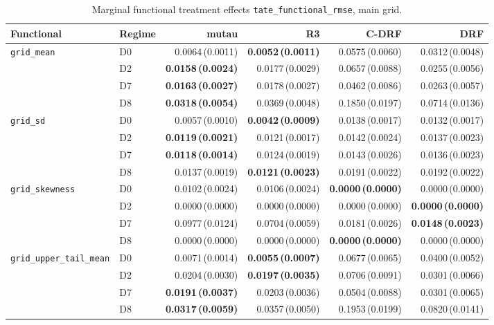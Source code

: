 \begin{table}[htbp]
\centering
\caption{Marginal functional treatment effects \texttt{tate\_functional\_rmse}, main grid.}
\label{tab:p55-tate}
\scriptsize
\setlength{\tabcolsep}{3.2pt}
\begin{tabular}{@{}llrrrr@{}}
\toprule
Functional & Regime & mutau & R3 & C-DRF & DRF \\
\midrule
\texttt{grid\_mean} & D0 & 0.0064\,(0.0011) & \textbf{0.0052\,(0.0011)} & 0.0575\,(0.0060) & 0.0312\,(0.0048) \\
 & D2 & \textbf{0.0158\,(0.0024)} & 0.0177\,(0.0029) & 0.0657\,(0.0088) & 0.0255\,(0.0056) \\
 & D7 & \textbf{0.0163\,(0.0027)} & 0.0178\,(0.0027) & 0.0462\,(0.0086) & 0.0263\,(0.0057) \\
 & D8 & \textbf{0.0318\,(0.0054)} & 0.0369\,(0.0048) & 0.1850\,(0.0197) & 0.0714\,(0.0136) \\
\midrule
\texttt{grid\_sd} & D0 & 0.0057\,(0.0010) & \textbf{0.0042\,(0.0009)} & 0.0138\,(0.0017) & 0.0132\,(0.0017) \\
 & D2 & \textbf{0.0119\,(0.0021)} & 0.0121\,(0.0017) & 0.0142\,(0.0024) & 0.0137\,(0.0023) \\
 & D7 & \textbf{0.0118\,(0.0014)} & 0.0124\,(0.0019) & 0.0143\,(0.0026) & 0.0136\,(0.0023) \\
 & D8 & 0.0137\,(0.0019) & \textbf{0.0121\,(0.0023)} & 0.0191\,(0.0022) & 0.0192\,(0.0022) \\
\midrule
\texttt{grid\_skewness} & D0 & 0.0102\,(0.0024) & 0.0106\,(0.0024) & \textbf{0.0000\,(0.0000)} & 0.0000\,(0.0000) \\
 & D2 & 0.0000\,(0.0000) & 0.0000\,(0.0000) & 0.0000\,(0.0000) & \textbf{0.0000\,(0.0000)} \\
 & D7 & 0.0977\,(0.0124) & 0.0704\,(0.0059) & 0.0181\,(0.0026) & \textbf{0.0148\,(0.0023)} \\
 & D8 & 0.0000\,(0.0000) & 0.0000\,(0.0000) & \textbf{0.0000\,(0.0000)} & 0.0000\,(0.0000) \\
\midrule
\texttt{grid\_upper\_tail\_mean} & D0 & 0.0071\,(0.0014) & \textbf{0.0055\,(0.0007)} & 0.0677\,(0.0065) & 0.0400\,(0.0052) \\
 & D2 & 0.0204\,(0.0030) & \textbf{0.0197\,(0.0035)} & 0.0706\,(0.0091) & 0.0301\,(0.0066) \\
 & D7 & \textbf{0.0191\,(0.0037)} & 0.0203\,(0.0036) & 0.0504\,(0.0088) & 0.0301\,(0.0065) \\
 & D8 & \textbf{0.0317\,(0.0059)} & 0.0357\,(0.0050) & 0.1953\,(0.0199) & 0.0820\,(0.0141) \\
\bottomrule
\end{tabular}
\end{table}

